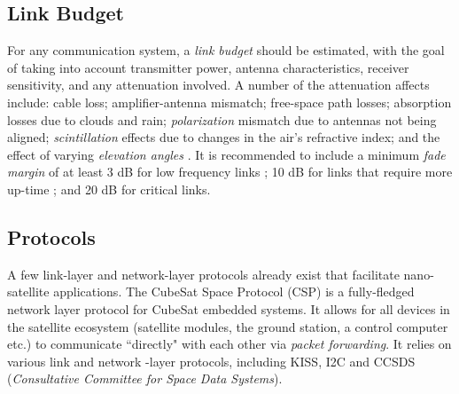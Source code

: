 \subsection{Link Budget}\label{sec:link_budget}
For any communication system, a \textit{link budget} should be estimated, with the goal of taking into account transmitter power, antenna characteristics, receiver sensitivity, and any attenuation involved. A number of the attenuation affects include: cable loss; amplifier-antenna mismatch; free-space path losses; absorption losses due to clouds and rain; \textit{polarization} mismatch due to antennas not being aligned; \textit{scintillation} effects due to changes in the air's refractive index; and the effect of varying \textit{elevation angles} \cite{design-satelliteLinkBudget}. It is recommended to include a minimum \textit{fade margin} of at least 3 dB for low frequency links \cite{paper-linkMargin}; 10 dB for links that require more up-time \cite{design-linkBudgetDesign}; and 20 dB for critical links.

\subsection{Protocols}
A few link-layer and network-layer protocols already exist that facilitate nano-satellite applications. 
The CubeSat Space Protocol (CSP) \cite{standard-csp} is a fully-fledged network layer protocol for CubeSat embedded systems. It allows for all devices in the satellite ecosystem (satellite modules, the ground station, a control computer etc.) to communicate ``directly" with each other via \textit{packet forwarding}. It relies on various link and network -layer protocols, including KISS, I2C and CCSDS (\textit{Consultative Committee for Space Data Systems}).